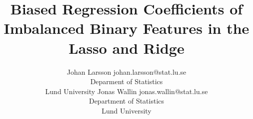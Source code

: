 \documentclass[10pt]{article} %
\title{Biased Regression Coefficients of Imbalanced Binary Features in the Lasso and Ridge}
\author{%
  \name Johan Larsson \email johan.larsson@stat.lu.se\\
  \addr Deparment of Statistics\\Lund University
  \AND
  \name Jonas Wallin \email jonas.wallin@stat.lu.se\\
  \addr Department of Statistics\\Lund University
}
\begin{document}
\maketitle

\begin{abstract}
  
\end{abstract}







%

%




\appendix



\end{document}
